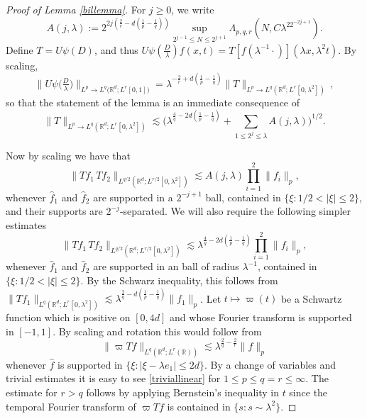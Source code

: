 \documentclass[11pt]{amsart}
\theoremstyle{definition}
\numberwithin{theorem}{section}
\numberwithin{definition}{section}
\numberwithin{equation}{section}
\newcommand{\Be}{\begin{equation}}
\newcommand{\Ee}{\end{equation}}
\newcommand{\R}{\mathbb{R}}
\renewcommand{\le}{\leqslant}
\renewcommand{\ge}{\geqslant}
\def\R{\mathbb R}
\def\lc{\lesssim}
\def\la{\lambda}             \def\La{\Lambda}
\def\bbR{{\mathbb {R}}}
\renewcommand{\le}{\leqslant}
\renewcommand{\ge}{\geqslant}
\begin{document}
\begin{proof}[Proof of Lemma \ref{billemma}]
For $j\ge 0$, we write
$$A(j,\la ):= 2^{2j(\frac{2}{r}-d(\frac 1p-\frac 1q))} \sup_{2^{j-1}\le N\le 2^{j+1}}
\Lambda_{p,q,r}(N, C\la ^22^{-2{j+1}}).
$$
Define $T=U\psi(D) $,
and thus  $U\psi(\tfrac{D}{\la} )f(x,t)= T[f(\la ^{-1}\cdot)](\la x,
\la ^2t)$. By scaling, \Be\label{firstscaling} \|U\psi\big(\tfrac
D\la \big)\|_{L^p\to {L^q(\bbR^d;L^r[0,1]})} = \la
^{-\frac2r+d(\frac 1p-\frac 1q)} \|T\|_{L^p\to L^q(\bbR^d;L^r[0,\la
^2])}\, , \Ee so that the statement of the lemma is an immediate
consequence of \Be\label{Tbound}\|T\|_{L^p\to L^q(\mathbb
R^d;L^r[0,\la ^2])}
\lc\Big(\la^{\frac{4}q-2d(\frac1p-\frac1q)}+\sum_{1\le 2^j\le \la}
A(j,\la) \Big)^{1/2}. \Ee

Now by scaling we have that \Be \label{separationrescaled} \big\|Tf_1\,
Tf_2\big\|_{L^{q/2}(\mathbb R^d ; L^{r/2}[0,\la^2])} \lc
A(j,\la) \prod_{i=1}^2\|f_i\|_p, \Ee whenever $\widehat f_1$ and
$\widehat f_2$ are supported in a $2^{-j+1}$ ball, contained
in $\{\xi:1/2<|\xi|\le 2\}$,  and their supports are
$2^{-j}$-separated.  We will also require the following
simpler estimates
 \Be \label{noseparation} \big\|Tf_1\,
Tf_2\big\|_{L^{q/2}(\mathbb R^d ; L^{r/2}[0,\la^2])} \lc
\la^{\frac{4}{q}-2d(\frac{1}{p}-\frac{1}{q})}\prod_{i=1}^2\|f_i\|_p, \Ee
 whenever $\widehat f_1$ and
$\widehat f_2$ are supported in an ball of radius $\la^{-1}$, contained
in $\{\xi:1/2<|\xi|\le 2\}$. By the Schwarz inequality, this follows from $\big\|Tf_1 \big\|_{L^{q}(\mathbb R^d ; L^{r}[0,\la^2])}\lc
\la^{\frac2q-d(\frac1p-\frac1q)}\|f_1\|_p$. Let $t\mapsto \varpi(t)$ be a Schwartz function which is
positive on $[0, 4d]$ and whose Fourier transform is supported in $[-1,1]$.
 By scaling and rotation this would follow from \Be \label{triviallinear}
\big\| \varpi Tf\big\|_{L^{q}(\mathbb R^d ;L^{r}(\R))}
\lc \la^{\frac{2}q-\frac{2}r}\|f\|_p\Ee whenever
$\widehat f$ is supported in  $\{\xi: |\xi-\la e_1|\le 2d\}$. By
a change of variables and trivial estimates it is easy to see
\eqref{triviallinear} for $1\le p\le q=r\le \infty$.
The estimate for $r>q$  follows by applying Bernstein's inequality in $t$
since the temporal Fourier transform of $\varpi Tf$ is contained in
$\{ s :  s \sim \la^2\}$.


\end{proof}
\end{document}
